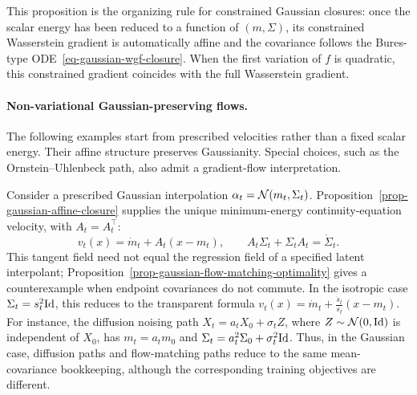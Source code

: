 This proposition is the organizing rule for constrained Gaussian closures: once the scalar energy has been reduced to a function of $(m,\Sigma)$, its constrained Wasserstein gradient is automatically affine and the covariance follows the Bures-type ODE~\eqref{eq-gaussian-wgf-closure}. When the first variation of $f$ is quadratic, this constrained gradient coincides with the full Wasserstein gradient.


\paragraph{Non-variational Gaussian-preserving flows.}

The following examples start from prescribed velocities rather than a fixed scalar energy. Their affine structure preserves Gaussianity. Special choices, such as the Ornstein--Uhlenbeck path, also admit a gradient-flow interpretation.

\begin{example}
	Consider a prescribed Gaussian interpolation $\alpha_t=\mathcal{N}(m_t,\Sigma_t)$. Proposition~\ref{prop-gaussian-affine-closure} supplies the unique minimum-energy continuity-equation velocity, with $A_t=A_t^\top$:
	\[
		v_t(x)=\dot m_t+A_t(x-m_t),
		\qquad
		A_t\Sigma_t+\Sigma_t A_t=\dot\Sigma_t.
	\]
	This tangent field need not equal the regression field of a specified latent interpolant; Proposition~\ref{prop-gaussian-flow-matching-optimality} gives a counterexample when endpoint covariances do not commute. In the isotropic case $\Sigma_t=s_t^2\mathrm{Id}$, this reduces to the transparent formula $v_t(x)=\dot m_t+\frac{\dot s_t}{s_t}(x-m_t)$. For instance, the diffusion noising path $X_t=a_tX_0+\sigma_t Z$, where $Z\sim\mathcal{N}(0,\mathrm{Id})$ is independent of $X_0$,
	has $m_t=a_tm_0$ and $\Sigma_t=a_t^2\Sigma_0+\sigma_t^2\mathrm{Id}$. Thus, in the Gaussian case, diffusion paths and flow-matching paths reduce to the same mean-covariance bookkeeping, although the corresponding training objectives are different.
\end{example}

